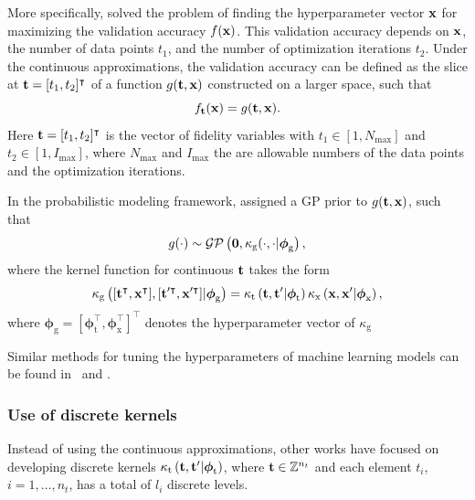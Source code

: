 \documentclass[iicol,sn-basic]{sn-jnl}%
\theoremstyle{thmstyleone}%
\theoremstyle{thmstyletwo}
\theoremstyle{thmstylethree}
\begin{document}
\begin{linenumbers}
More specifically, \cite{Kandasamy2017} solved the problem of finding the hyperparameter vector ${\bf x}$ for maximizing the validation accuracy $f({\bf x})$.
This validation accuracy depends on ${\bf x}$, the number of data points $t_1$, and the number of optimization iterations $t_2$.
Under the continuous approximations, the validation accuracy can be defined as the slice at ${\bf t}=[t_1,t_2]^\intercal$ of a function $g({\bf t},{\bf x})$ constructed on a larger space, such that
\begin{equation}\label{Eq34}
	f_{\bf t}({\bf x}) = g({\bf t},{\bf x}).
\end{equation}
Here ${\bf t}=[t_1,t_2]^\intercal$ is the vector of fidelity variables with $t_1 \in [1,N_{\max}]$ and $t_2 \in [1,I_{\max}]$, where $N_{\max}$ and $I_{\max}$ the are allowable numbers of the data points and the optimization iterations.
 
In the probabilistic modeling framework, \cite{Kandasamy2017} assigned a GP prior to  $g({\bf t},{\bf x})$, such that
\begin{equation}\label{Eq35}
	g(\cdot) \sim \mathcal{GP}\left({\bf 0},\kappa_\text{g}(\cdot,\cdot|{\boldsymbol \phi}_\text{g}\right),
\end{equation}
where the kernel function for continuous ${\bf t}$ takes the form~\citep{Kandasamy2017}
\begin{equation}\label{Eq36}
	\kappa_\text{g}\left([{\bf t}^\intercal,{\bf x}^\intercal],[{\bf t}'^\intercal,{\bf x}'^\intercal]|{\boldsymbol \phi}_\text{g}\right)=\kappa_\text{t}\left({\bf t},{\bf t}'|{\boldsymbol \phi}_\text{t}\right)\kappa_\text{x}\left({\bf x},{\bf x}'|{\boldsymbol \phi}_\text{x}\right),
\end{equation}
where ${\boldsymbol \phi}_\text{g} = [{\boldsymbol \phi}_\text{t}^\intercal,{\boldsymbol \phi}_\text{x}^\intercal]^\intercal$ denotes the hyperparameter vector of $\kappa_\text{g}$ 

Similar methods for tuning the hyperparameters of machine learning models can be found in~\cite{Poloczek2017} and \cite{JWu2020}.

\subsubsection{Use of discrete kernels}\label{Sec562}

Instead of using the continuous approximations, other works have focused on developing discrete kernels $\kappa_\text{t}\left({\bf t},{\bf t}'|{\boldsymbol \phi}_\text{t}\right)$, where ${\bf t} \in \mathbb{Z}^{n_t}$ and each element $t_i$, $i=1,\dots,n_t$, has a total of $l_i$ discrete levels.


\end{linenumbers}
\end{document}
